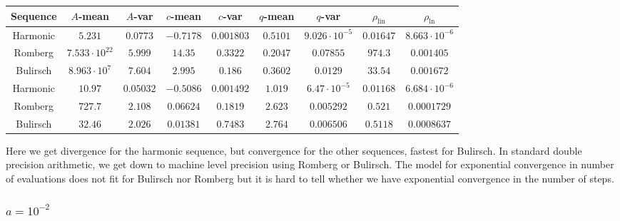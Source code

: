\begin{table}[H]
    \centering
        \small
    \begin{tabular}{c||c|c|c|c|c|c|c|c}
Sequence & \(A\)-mean & \(A\)-var & \(c\)-mean & \(c\)-var & \(q\)-mean & \(q\)-var & \(\rho_{\operatorname{lin}}\) & \(\rho_{\ln}\)\\\hline
\rowcolor{red}
Harmonic & \(5.231\) & \(0.0773\) & \(-0.7178\) & \(0.001803\) & \(0.5101\) & \(9.026\cdot 10^{-5}\) & \(0.01647\) & \(8.663\cdot 10^{-6}\) \\
\rowcolor{red}
Romberg & \(7.533\cdot 10^{22}\) & \(5.999\) & \(14.35\) & \(0.3322\) & \(0.2047\) & \(0.07855\) & \(974.3\) & \(0.001405\) \\
\rowcolor{red}
Bulirsch & \(8.963\cdot 10^7\) & \(7.604\) & \(2.995\) & \(0.186\) & \(0.3602\) & \(0.0129\) & \(33.54\) & \(0.001672\) \\
\rowcolor{red}
Harmonic & \(10.97\) & \(0.05032\) & \(-0.5086\) & \(0.001492\) & \(1.019\) & \(6.47\cdot 10^{-5}\) & \(0.01168\) & \(6.684\cdot 10^{-6}\) \\
\rowcolor{yellow}
Romberg & \(727.7\) & \(2.108\) & \(0.06624\) & \(0.1819\) & \(2.623\) & \(0.005292\) & \(0.521\) & \(0.0001729\) \\
\rowcolor{yellow}
Bulirsch & \(32.46\) & \(2.026\) & \(0.01381\) & \(0.7483\) & \(2.764\) & \(0.006506\) & \(0.5118\) & \(0.0008637\) \\
    \end{tabular}
    \label{tab:my_label}
\end{table}

Here we get divergence for the harmonic sequence, but convergence for the other sequences, fastest for Bulirsch. In standard double precision arithmetic, we get down to machine level precision using Romberg or Bulirsch. The model for exponential convergence in number of evaluations does not fit for Bulirsch nor Romberg but it is hard to tell whether we have exponential convergence in the number of steps.

\subsubsection{\(a = 10^{-2}\)}

